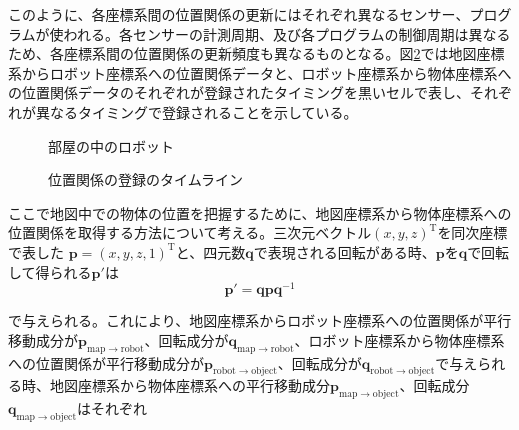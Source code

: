 \documentclass[a4paper]{jreport}	%
\begin{document}
このように、各座標系間の位置関係の更新にはそれぞれ異なるセンサー、プログラムが使われる。各センサーの計測周期、及び各プログラムの制御周期は異なるため、各座標系間の位置関係の更新頻度も異なるものとなる。図\ref{fig:sensor-sync}では地図座標系からロボット座標系への位置関係データと、ロボット座標系から物体座標系への位置関係データのそれぞれが登録されたタイミングを黒いセルで表し、それぞれが異なるタイミングで登録されることを示している。

\begin{figure}[h] 
\caption{部屋の中のロボット}
\label{fig:room}
\end{figure}

\begin{figure}[h] 
\caption{位置関係の登録のタイムライン}
\label{fig:sensor-sync}
\end{figure}


ここで地図中での物体の位置を把握するために、地図座標系から物体座標系への位置関係を取得する方法について考える。三次元ベクトル$(x, y, z)^{\mathrm{T}}$を同次座標で表した $\mathbf{p} = (x, y, z, 1)^{\mathrm{T}}$と、四元数$\mathbf{q}$で表現される回転がある時、$\mathbf{p}$を$\mathbf{q}$で回転して得られる$\mathbf{p'}$は
\begin{equation}
	\mathbf{p'} = \mathbf{qpq}^{-1}
\end{equation}

で与えられる。これにより、地図座標系からロボット座標系への位置関係が平行移動成分が$\mathbf{p}_{\mathrm{map \rightarrow robot}}$、回転成分が$\mathbf{q}_{\mathrm{map \rightarrow  robot}}$、ロボット座標系から物体座標系への位置関係が平行移動成分が$\mathbf{p}_{\mathrm{robot \rightarrow object}}$、回転成分が$\mathbf{q}_{\mathrm{robot \rightarrow object}}$で与えられる時、地図座標系から物体座標系への平行移動成分$\mathbf{p}_{\mathrm{map \rightarrow object}}$、回転成分$\mathbf{q}_{\mathrm{map \rightarrow object}}$はそれぞれ
\end{document}
